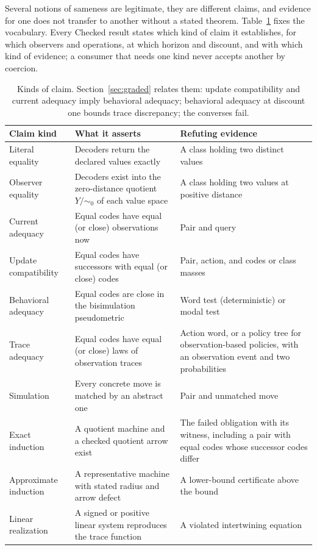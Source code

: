 \documentclass[11pt]{article}
\theoremstyle{definition}
\theoremstyle{plain}
\begin{document}
Several notions of sameness are legitimate, they are different claims, and evidence for one does
not transfer to another without a stated theorem. Table~\ref{tab:claims} fixes the vocabulary.
Every Checked result states which kind of claim it establishes, for which observers and
operations, at which horizon and discount, and with which kind of evidence; a consumer that
needs one kind never accepts another by coercion.

\begin{table}[ht]
\centering\small
\begin{tabularx}{\textwidth}{>{\raggedright\arraybackslash}p{3.4cm}>{\raggedright\arraybackslash}X>{\raggedright\arraybackslash}p{4.2cm}}
\toprule
Claim kind & What it asserts & Refuting evidence\\
\midrule
Literal equality & Decoders return the declared values exactly & A class holding two distinct values\\
Observer equality & Decoders exist into the zero-distance quotient $Y/{\sim_0}$ of each value space & A class holding two values at positive distance\\
Current adequacy & Equal codes have equal (or close) observations now & Pair and query\\
Update compatibility & Equal codes have successors with equal (or close) codes & Pair, action, and codes or class masses\\
Behavioral adequacy & Equal codes are close in the bisimulation pseudometric & Word test (deterministic) or modal test\\
Trace adequacy & Equal codes have equal (or close) laws of observation traces & Action word, or a policy tree for observation-based policies, with an observation event and two probabilities\\
Simulation & Every concrete move is matched by an abstract one & Pair and unmatched move\\
Exact induction & A quotient machine and a checked quotient arrow exist & The failed obligation with its witness, including a pair with equal codes whose successor codes differ\\
Approximate induction & A representative machine with stated radius and arrow defect & A lower-bound certificate above the bound\\
Linear realization & A signed or positive linear system reproduces the trace function & A violated intertwining equation\\
\bottomrule
\end{tabularx}
\caption{Kinds of claim. Section~\ref{sec:graded} relates them: update compatibility and current
adequacy imply behavioral adequacy; behavioral adequacy at discount one bounds trace discrepancy;
the converses fail.}\label{tab:claims}
\end{table}
\end{document}
